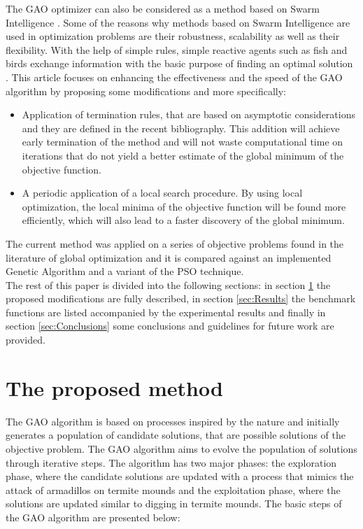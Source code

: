 \documentclass[journal,article,submit,pdftex,moreauthors]{Definitions/mdpi}
\begin{document}
The GAO optimizer can also be considered as a method based on Swarm Intelligence \cite{swarm_book}. Some of the reasons why methods based on Swarm Intelligence are used in optimization problems are their robustness, scalability as well as their flexibility. With the help of simple rules, simple reactive agents such as fish and birds exchange information with the basic purpose of finding an optimal solution \cite{swarm_overview1,swarm_overview2}.
This article focuses on enhancing the effectiveness and the speed of the  GAO algorithm by proposing some modifications and more specifically: 
\begin{itemize}
    \item  Application of  termination rules, that are based on asymptotic considerations and they are defined in the recent bibliography. This addition will achieve early termination of the method and will not waste computational time on iterations that do not yield a better estimate of the global minimum of the objective function.
    \item A periodic application of a local search procedure. By using local optimization, the local minima of the objective function will be found more efficiently, which will also lead to a faster discovery of the global minimum.

\end{itemize}
The current method was applied on a series of objective problems found in the  literature of global optimization and it is compared against an implemented Genetic Algorithm and a variant of the PSO technique.\\

The rest of this paper is divided into the following sections: in section \ref{sec:Method} the proposed modifications are fully described, in section \ref{sec:Results} the benchmark functions are listed accompanied by  the experimental results and finally in section \ref{sec:Conclusions} some conclusions and guidelines for future work are provided.

\section{The proposed method}\label{sec:Method}
The GAO algorithm is based on processes inspired by the nature and initially generates a population of candidate solutions, that are possible solutions of the objective problem. The GAO algorithm aims to evolve the population of solutions through iterative steps.  The algorithm has two major phases: the exploration phase, where the candidate solutions are updated with a process that mimics the attack of armadillos on termite mounds and the exploitation phase, where the solutions are updated similar to digging in termite mounds. The basic steps of the GAO algorithm are presented below:
\end{document}
